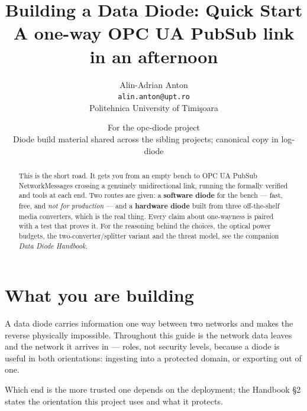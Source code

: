 \documentclass[11pt,a4paper]{article}
\title{\vspace{-12mm}\textbf{Building a Data Diode: Quick Start}\\[2mm]
       \large A one-way OPC UA PubSub link in an afternoon}
\author{Alin-Adrian Anton \\
        \small \texttt{alin.anton@upt.ro} \\
        \small Politehnica University of Timi\c{s}oara}
\date{\small For the opc-diode project\\
      \small Diode build material shared across the sibling
      projects; canonical copy in log-diode}
\renewcommand{\amp}{\prog{od\_sender}}
\renewcommand{\deamp}{\prog{od\_receiver}}
\begin{document}
\maketitle
\thispagestyle{fancy}

\begin{abstract}
\noindent
This is the short road. It gets you from an empty bench to OPC UA PubSub NetworkMessages
crossing a genuinely unidirectional link, running the formally verified
\amp{} and \deamp{} tools at each end. Two routes are given: a
\textbf{software diode} for the bench --- fast, free, and \emph{not for
production} --- and a \textbf{hardware diode} built from three off-the-shelf
media converters, which is the real thing. Every claim about one-wayness is
paired with a test that proves it. For the reasoning behind the choices, the
optical power budgets, the two-converter/splitter variant and the threat
model, see the companion \emph{Data Diode Handbook}.
\end{abstract}

\vspace{2mm}
\tableofcontents
\vspace{4mm}

\section{What you are building}

A data diode carries information one way between two networks and makes the
reverse physically impossible. Throughout this guide \srcside{} is the network
data leaves and \dstside{} the network it arrives in --- roles, not security
levels, because a diode is useful in both orientations: ingesting into a
protected domain, or exporting out of one.

Which end is the more trusted one depends on the deployment; the Handbook
\S2 states the orientation this project uses and what it protects.
\end{document}
